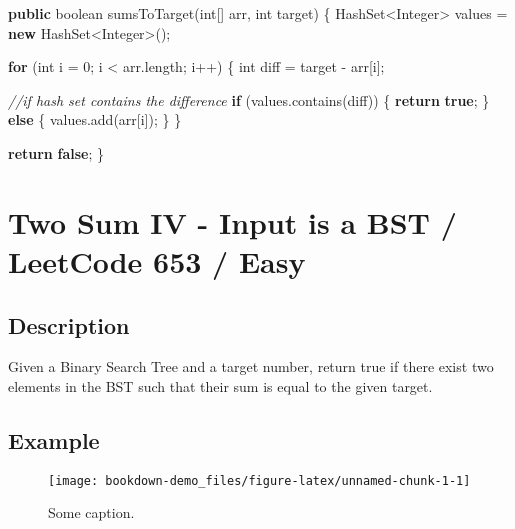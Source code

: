 \documentclass[]{book}
\newenvironment{Shaded}{\begin{snugshade}}{\end{snugshade}}
\newcommand{\BuiltInTok}[1]{#1}
\newcommand{\CommentTok}[1]{\textcolor[rgb]{0.56,0.35,0.01}{\textit{#1}}}
\newcommand{\DataTypeTok}[1]{\textcolor[rgb]{0.13,0.29,0.53}{#1}}
\newcommand{\DecValTok}[1]{\textcolor[rgb]{0.00,0.00,0.81}{#1}}
\newcommand{\FunctionTok}[1]{\textcolor[rgb]{0.00,0.00,0.00}{#1}}
\newcommand{\KeywordTok}[1]{\textcolor[rgb]{0.13,0.29,0.53}{\textbf{#1}}}
\newcommand{\NormalTok}[1]{#1}
\begin{document}
\begin{Shaded}
\begin{Highlighting}[]
\KeywordTok{public} \DataTypeTok{boolean} \FunctionTok{sumsToTarget}\NormalTok{(}\DataTypeTok{int}\NormalTok{[] arr, }\DataTypeTok{int}\NormalTok{ target) \{}
    \BuiltInTok{HashSet}\NormalTok{<}\BuiltInTok{Integer}\NormalTok{> values = }\KeywordTok{new} \BuiltInTok{HashSet}\NormalTok{<}\BuiltInTok{Integer}\NormalTok{>();}

    \KeywordTok{for}\NormalTok{ (}\DataTypeTok{int}\NormalTok{ i = }\DecValTok{0}\NormalTok{; i < arr.}\FunctionTok{length}\NormalTok{; i++) \{}
        \DataTypeTok{int}\NormalTok{ diff = target - arr[i];}

        \CommentTok{//if hash set contains the difference}
        \KeywordTok{if}\NormalTok{ (values.}\FunctionTok{contains}\NormalTok{(diff)) \{}
            \KeywordTok{return} \KeywordTok{true}\NormalTok{;}
\NormalTok{        \} }\KeywordTok{else}\NormalTok{ \{}
\NormalTok{            values.}\FunctionTok{add}\NormalTok{(arr[i]);}
\NormalTok{        \}}
\NormalTok{    \}}

    \KeywordTok{return} \KeywordTok{false}\NormalTok{;}
\NormalTok{\}}
\end{Highlighting}
\end{Shaded}

\hypertarget{two-sum-iv---input-is-a-bst-leetcode-653-easy}{%
\section{Two Sum IV - Input is a BST / LeetCode 653 / Easy}\label{two-sum-iv---input-is-a-bst-leetcode-653-easy}}

\hypertarget{description-2}{%
\subsection{Description}\label{description-2}}

Given a Binary Search Tree and a target number, return true if there exist two elements in the BST such that their sum
is equal to the given target.

\hypertarget{example-1}{%
\subsection{Example}\label{example-1}}

\begin{figure}
\texttt{[image: bookdown-demo\_files/figure-latex/unnamed-chunk-1-1]} \caption{Some caption.}\label{fig:unnamed-chunk-1}
\end{figure}
\end{document}
